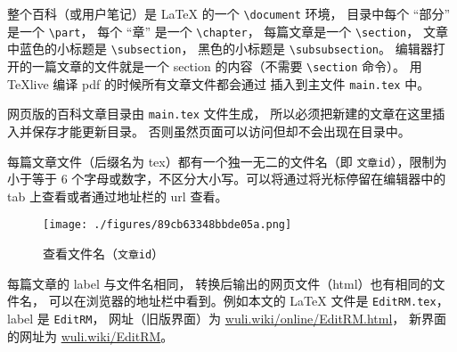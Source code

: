 整个百科（或用户笔记）是 LaTeX 的一个 \verb|\document| 环境， 目录中每个 “部分” 是一个 \verb|\part|， 每个 “章” 是一个 \verb|\chapter|， 每篇文章是一个 \verb|\section|， 文章中蓝色的小标题是 \verb|\subsection|， 黑色的小标题是 \verb|\subsubsection|。 编辑器打开的一篇文章的文件就是一个 section 的内容（不需要 \verb|\section| 命令）。 用 TeXlive 编译 pdf 的时候所有文章文件都会通过 \verb|| 插入到主文件 \verb`main.tex` 中。

网页版的百科文章目录由 \verb|main.tex| 文件生成， 所以必须把新建的文章在这里插入并保存才能更新目录。 否则虽然页面可以访问但却不会出现在目录中。

每篇文章文件（后缀名为 tex）都有一个独一无二的文件名（即 \verb`文章id`），限制为小于等于 6 个字母或数字，不区分大小写。可以将通过将光标停留在编辑器中的 tab 上查看或者通过地址栏的 url 查看。

\begin{figure}[ht]
\centering
\texttt{[image: ./figures/89cb63348bbde05a.png]}
\caption{查看文件名（\verb`文章id`）} \label{fig_editor_2}
\end{figure}

每篇文章的 label 与文件名相同， 转换后输出的网页文件（html）也有相同的文件名， 可以在浏览器的地址栏中看到。例如本文的 LaTeX 文件是 \verb|EditRM.tex|， label 是 \verb|EditRM|， 网址（旧版界面）为 \href{https://wuli.wiki/online/EditRM.html}{wuli.wiki/online/EditRM.html}， 新界面的网址为 \href{https://wuli.wiki/EditRM}{wuli.wiki/EditRM}。

